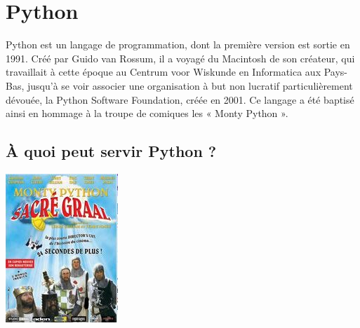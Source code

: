 \documentclass[10pt,fleqn]{article} %
\begin{document}
\section{Python}


\begin{minipage}[c]{.79\linewidth}

Python est un langage de programmation, dont la première version est sortie en 1991. Créé par Guido van Rossum, il a voyagé du Macintosh de son créateur, qui travaillait à cette époque au Centrum voor Wiskunde en Informatica aux Pays-Bas, jusqu'à se voir associer une organisation à but non lucratif particulièrement dévouée, la Python Software Foundation, créée en 2001. Ce langage a été baptisé ainsi en hommage à la troupe de comiques les « Monty Python ».

\subsection{À quoi peut servir Python ?}
\end{minipage} \hfill
\begin{minipage}[c]{.2\linewidth}
\begin{center}
\includegraphics[width=.99\textwidth]{images/monty.jpg}
\end{center}
\end{minipage}
\end{document}
